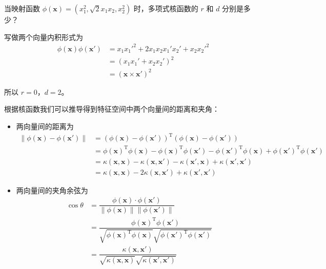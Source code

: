 \begin{example}
    当映射函数 $\phi(\boldsymbol x) = (x_1^2, \sqrt2x_1x_2, x_2^2)$ 时，多项式核函数的 $r$ 和 $d$ 分别是多少？

写做两个向量内积形式为
\begin{equation}
    \begin{aligned}
        \phi(\boldsymbol x)\phi(\boldsymbol x') &= x_1x_1'^2 + 2x_1x_2x_1'x_2'+x_2x_2'^2 \\
        &= (x_1x_1' + x_2x_2')^2 \\
        &= (\boldsymbol x \times \boldsymbol x')^2
        \end{aligned}
\end{equation}

所以 $r = 0$，$d = 2$。
\end{example}

根据核函数我们可以推导得到特征空间中两个向量间的距离和夹角：
\begin{itemize}
    \item 两向量间的距离为
    \begin{equation}
        \begin{aligned}
            \|\phi(\boldsymbol x) - \phi(\boldsymbol x')\| &= (\phi(\boldsymbol x) - \phi(\boldsymbol x'))^\mathrm T(\phi(\boldsymbol x) - \phi(\boldsymbol x')) \\
            &= \phi(\boldsymbol x)^\mathrm T\phi(\boldsymbol x) - \phi(\boldsymbol x)^\mathrm T\phi(\boldsymbol x') - \phi(\boldsymbol x')^\mathrm T\phi(\boldsymbol x) + \phi(\boldsymbol x')^\mathrm T\phi(\boldsymbol x') \\
            &= \kappa(\boldsymbol x, \boldsymbol x) - \kappa(\boldsymbol x, \boldsymbol x') - \kappa(\boldsymbol x', \boldsymbol x) + \kappa(\boldsymbol x', \boldsymbol x') \\
            &= \kappa(\boldsymbol x, \boldsymbol x) - 2\kappa(\boldsymbol x, \boldsymbol x') + \kappa(\boldsymbol x', \boldsymbol x')
            \end{aligned}
    \end{equation}
    \item 两向量间的夹角余弦为
    \begin{equation}
        \begin{aligned}
            \cos \theta &= \dfrac{\phi(\boldsymbol x) \cdot \phi(\boldsymbol x')}{\|\phi(\boldsymbol x)\|\|\phi(\boldsymbol x')\|} \\
            &= \dfrac{\phi(\boldsymbol x)^\mathrm T\phi(\boldsymbol x')}{\sqrt{\phi(\boldsymbol x)^\mathrm T\phi(\boldsymbol x)}\sqrt{\phi(\boldsymbol x')^\mathrm T\phi(\boldsymbol x')}} \\
            &= \dfrac{\kappa(\boldsymbol x, \boldsymbol x')}{\sqrt{\kappa(\boldsymbol x, \boldsymbol x)}\sqrt{\kappa(\boldsymbol x', \boldsymbol x')}}
            \end{aligned}
    \end{equation}
\end{itemize}

